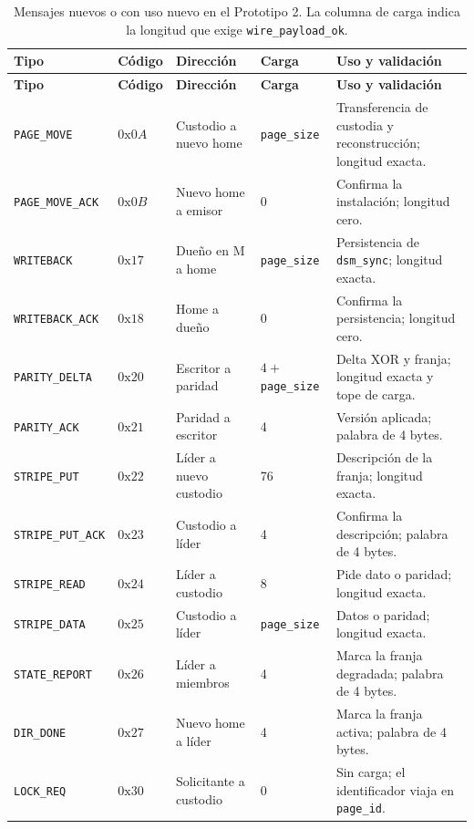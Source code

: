 \documentclass[11pt,spanish]{article}
\begin{document}
{\small
\begin{xltabular}{\linewidth}{l l l l Y}
\caption{Mensajes nuevos o con uso nuevo en el Prototipo 2. La columna de carga indica la longitud que exige \texttt{wire\_payload\_ok}.}\\
\toprule
\textbf{Tipo} & \textbf{Código} & \textbf{Dirección} & \textbf{Carga} & \textbf{Uso y validación} \\
\midrule
\endfirsthead
\toprule
\textbf{Tipo} & \textbf{Código} & \textbf{Dirección} & \textbf{Carga} & \textbf{Uso y validación} \\
\midrule
\endhead
\texttt{PAGE\_MOVE} & $0\text{x}0A$ & Custodio a nuevo home & \texttt{page\_size} & Transferencia de custodia y reconstrucción; longitud exacta. \\
\texttt{PAGE\_MOVE\_ACK} & $0\text{x}0B$ & Nuevo home a emisor & 0 & Confirma la instalación; longitud cero. \\
\texttt{WRITEBACK} & $0\text{x}17$ & Dueño en M a home & \texttt{page\_size} & Persistencia de \texttt{dsm\_sync}; longitud exacta. \\
\texttt{WRITEBACK\_ACK} & $0\text{x}18$ & Home a dueño & 0 & Confirma la persistencia; longitud cero. \\
\texttt{PARITY\_DELTA} & $0\text{x}20$ & Escritor a paridad & $4 + $ \texttt{page\_size} & Delta XOR y franja; longitud exacta y tope de carga. \\
\texttt{PARITY\_ACK} & $0\text{x}21$ & Paridad a escritor & 4 & Versión aplicada; palabra de 4 bytes. \\
\texttt{STRIPE\_PUT} & $0\text{x}22$ & Líder a nuevo custodio & 76 & Descripción de la franja; longitud exacta. \\
\texttt{STRIPE\_PUT\_ACK} & $0\text{x}23$ & Custodio a líder & 4 & Confirma la descripción; palabra de 4 bytes. \\
\texttt{STRIPE\_READ} & $0\text{x}24$ & Líder a custodio & 8 & Pide dato o paridad; longitud exacta. \\
\texttt{STRIPE\_DATA} & $0\text{x}25$ & Custodio a líder & \texttt{page\_size} & Datos o paridad; longitud exacta. \\
\texttt{STATE\_REPORT} & $0\text{x}26$ & Líder a miembros & 4 & Marca la franja degradada; palabra de 4 bytes. \\
\texttt{DIR\_DONE} & $0\text{x}27$ & Nuevo home a líder & 4 & Marca la franja activa; palabra de 4 bytes. \\
\texttt{LOCK\_REQ} & $0\text{x}30$ & Solicitante a custodio & 0 & Sin carga; el identificador viaja en \texttt{page\_id}. \\

\end{xltabular}}
\end{document}
